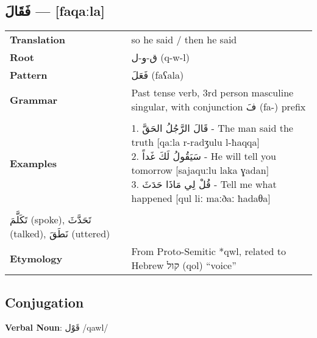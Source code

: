 \documentclass[letterpaper,12pt]{article}
\begin{document}
\subsection{\textarabic{فَقَالَ} — [faqaːla]}
\begin{tabular}{p{3cm}p{10cm}}
\toprule
\textbf{Translation} & so he said / then he said \\
\textbf{Root} & \textarabic{ق-و-ل} (q-w-l) \\
\textbf{Pattern} & \textarabic{فَعَلَ} (faʕala) \\
\textbf{Grammar} & Past tense verb, 3rd person masculine singular, with conjunction \textarabic{فَ} (fa-) prefix \\
\midrule \\
\textbf{Examples} & \makecell[l]{\parbox{9.5cm}{
1. \textarabic{قَالَ الرَّجُلُ الحَقَّ} - The man said the truth [qaːla r-radʒulu l-ħaqqa]\\
2. \textarabic{سَيَقُولُ لَكَ غَداً} - He will tell you tomorrow [sajaquːlu laka ɣadan]\\
3. \textarabic{قُلْ لِي مَاذَا حَدَثَ} - Tell me what happened [qul liː maːðaː ħadaθa]
} } \\
\midrule \\
\textarabic{تَكَلَّمَ} (spoke), \textarabic{تَحَدَّثَ} (talked), \textarabic{نَطَقَ} (uttered) \\
\textbf{Etymology} & From Proto-Semitic *qwl, related to Hebrew \texthebrew{קול} (qol) ``voice'' \\
\bottomrule
\end{tabular}

\subsection{Conjugation}
\par{ \large \textbf{Verbal Noun}: \textarabic{قَوْل} /qawl/}
\end{document}
